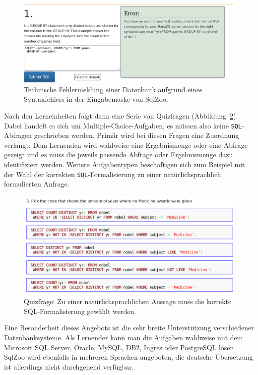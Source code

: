 \begin{figure}[p]
  \centering \includegraphics[width=\textwidth]{images/related-work-sql-zoo-error.png}
  \caption{Technische Fehlermeldung einer Datenbank aufgrund eines Syntaxfehlers in der Eingabemaske von SqlZoo.}
  \label{fig:sqlzoo-check-result}
\end{figure}

Nach den Lerneinheiten folgt dann eine Serie von Quizfragen (Abbildung~\ref{fig:sqlzoo-quiz-sql-formalization}). Dabei handelt es sich um Multiple-Choice-Aufgaben, es müssen also keine \texttt{SQL}-Abfragen geschrieben werden. Primär wird bei diesen Fragen eine Zuordnung verlangt: Dem Lernenden wird wahlweise eine Ergebnismenge oder eine Abfrage gezeigt und es muss die jeweils passende Abfrage oder Ergebnismenge dazu identifiziert werden. Weitere Aufgabentypen beschäftigen sich zum Beispiel mit der Wahl der korrekten \texttt{SQL}-Formalisierung zu einer natürlichsprachlich formulierten Anfrage.

\begin{figure}[p]
  \centering \includegraphics[width=\textwidth]{images/related-work-sql-zoo-quiz-select-sql.png}
  \caption{Quizfrage: Zu einer natürlichsprachlichen Aussage muss die korrekte SQL-Formalisierung gewählt werden.}
  \label{fig:sqlzoo-quiz-sql-formalization}
\end{figure}

Eine Besonderheit dieses Angebots ist die sehr breite Unterstützung verschiedener Datenbanksysteme. Als Lernender kann man die Aufgaben wahlweise mit dem Microsoft SQL Server, Oracle, MySQL, DB2, Ingres oder PostgreSQL lösen. SqlZoo wird ebenfalls in mehreren Sprachen angeboten, die deutsche Übersetzung ist allerdings nicht durchgehend verfügbar.

